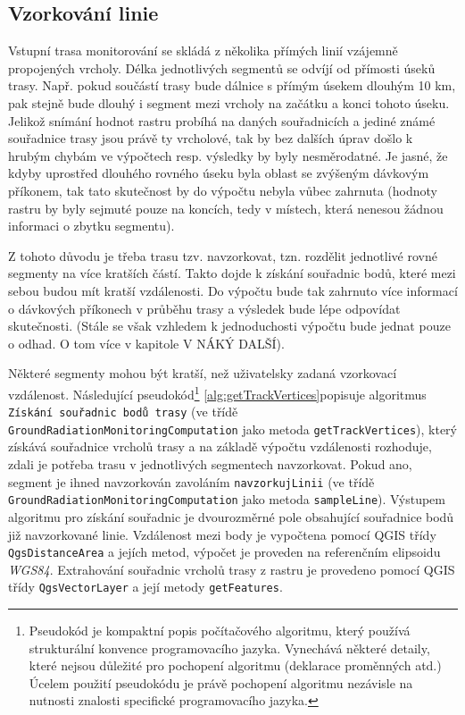 \subsection{Vzorkování linie}
\label{subsec:vzorkovaniLinie}
Vstupní trasa monitorování se skládá z několika přímých linií vzájemně propojených vrcholy. Délka jednotlivých segmentů se odvíjí od přímosti úseků trasy. Např. pokud součástí trasy bude dálnice s přímým úsekem dlouhým 10 km, pak stejně bude dlouhý i segment mezi vrcholy na začátku a konci tohoto úseku. Jelikož snímání hodnot rastru probíhá na daných souřadnicích a jediné známé souřadnice trasy jsou právě ty vrcholové, tak by bez dalších úprav došlo k hrubým chybám ve výpočtech resp. výsledky by byly nesměrodatné. Je jasné, že kdyby uprostřed dlouhého rovného úseku byla oblast se zvýšeným dávkovým příkonem, tak tato skutečnost by do výpočtu nebyla vůbec zahrnuta (hodnoty rastru by byly sejmuté pouze na koncích, tedy v místech, která nenesou žádnou informaci o zbytku segmentu). 

Z tohoto důvodu je třeba trasu tzv. navzorkovat, tzn. rozdělit jednotlivé rovné segmenty na více kratších částí. Takto dojde k získání souřadnic bodů, které mezi sebou budou mít kratší vzdálenosti. Do výpočtu bude tak zahrnuto více informací o dávkových příkonech v průběhu trasy a výsledek bude lépe odpovídat skutečnosti. (Stále se však vzhledem k jednoduchosti výpočtu bude jednat pouze o odhad. O tom více v kapitole V NÁKÝ DALŠÍ). 

Některé segmenty mohou být kratší, než uživatelsky zadaná vzorkovací vzdálenost. Následující pseudokód\footnote{Pseudokód je kompaktní popis počítačového algoritmu, který používá strukturální konvence programovacího jazyka. Vynechává některé detaily, které nejsou důležité pro pochopení algoritmu (deklarace proměnných atd.) Úcelem použití pseudokódu je právě pochopení algoritmu nezávisle na nutnosti znalosti specifické programovacího jazyka.} %
\ref{alg:getTrackVertices}popisuje algoritmus \texttt{Získání souřadnic bodů trasy} (ve třídě \texttt{GroundRadiationMonitoringComputation} jako metoda \texttt{getTrackVertices}), který získává souřadnice vrcholů trasy a na základě výpočtu vzdálenosti rozhoduje, zdali je potřeba trasu v jednotlivých segmentech navzorkovat. Pokud ano, segment je ihned navzorkován zavoláním \texttt{navzorkujLinii} (ve třídě \texttt{GroundRadiationMonitoringComputation} jako metoda \texttt{sampleLine}). Výstupem algoritmu pro získání souřadnic je dvourozměrné pole obsahující souřadnice bodů již navzorkované linie. Vzdálenost mezi body je vypočtena pomocí QGIS třídy \texttt{QgsDistanceArea} a jejích metod, výpočet je proveden na referenčním elipsoidu \textit{WGS84}. Extrahování souřadnic vrcholů trasy z rastru je provedeno pomocí QGIS třídy \texttt{QgsVectorLayer} a její metody \texttt{getFeatures}.


